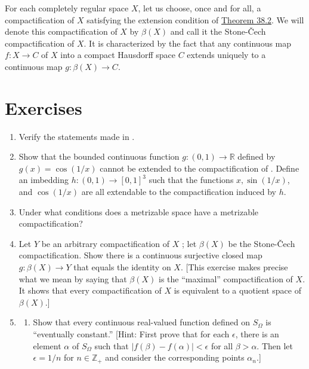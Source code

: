 \begin{definition}
 For each completely regular space \(X\), let us choose, once and for all, a compactification of \(X\) satisfying the extension condition of \hyperref[thm:38.2]{Theorem 38.2}. We will denote this compactification of \(X\) by \(\beta (X)\) and call it the Stone-Čech compactification of \(X\). It is characterized by the fact that any continuous map \(f : X \rightarrow C\) of \(X\) into a compact Hausdorff space \(C\) extends uniquely to a continuous map \(g : \beta (X) \rightarrow C\).
\end{definition}

\section*{Exercises}
\begin{enumerate}[itemsep=0.4em, parsep=0pt, topsep=0pt, partopsep=0pt, leftmargin=*, label=\arabic*., ref=\arabic*]
\item Verify the statements made in .
\item Show that the bounded continuous function \(g : ( {0,1}) \rightarrow \mathbb{R}\) defined by \(g(x) = \cos ( {1/x})\) cannot be extended to the compactification of . Define an imbedding \(h : ( {0,1}) \rightarrow {[ 0,1] }^{3}\) such that the functions \(x,\sin ( {1/x})\), and \(\cos ( {1/x})\) are all extendable to the compactification induced by \(h\).
\item Under what conditions does a metrizable space have a metrizable compactification?
\item Let \(Y\) be an arbitrary compactification of \(X\) ; let \(\beta (X)\) be the Stone-Čech compactification. Show there is a continuous surjective closed map \(g : \beta (X) \rightarrow Y\) that equals the identity on \(X\). [This exercise makes precise what we mean by saying that \(\beta (X)\) is the ``maximal'' compactification of \(X\). It shows that every compactification of \(X\) is equivalent to a quotient space of \(\beta (X)\).]
\item
 \begin{enumerate}[itemsep=0.2em, parsep=0pt, topsep=0pt, partopsep=0pt, leftmargin=*, label=(\alph*), align=left]
 \item Show that every continuous real-valued function defined on \(S_{\Omega }\) is ``eventually constant.'' [Hint: First prove that for each \(\epsilon\), there is an element \(\alpha\) of \(S_{\Omega }\) such that \(| {f( \beta ) - f( \alpha ) }| < \epsilon\) for all \(\beta > \alpha\). Then let \(\epsilon = 1/n\) for \(n \in {\mathbb{Z}}_{ + }\) and consider the corresponding points \({\alpha }_{n}\).]


\end{enumerate}
\end{enumerate}
